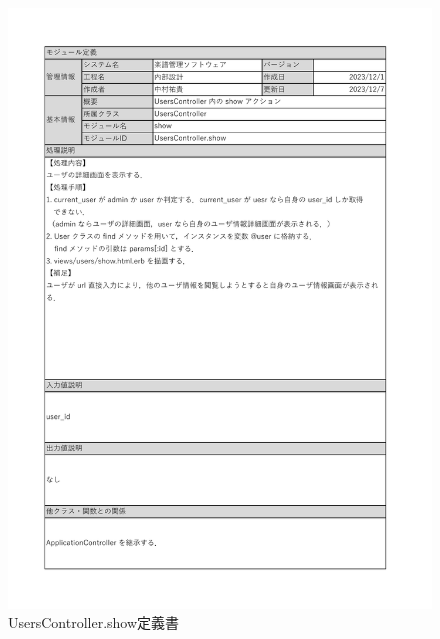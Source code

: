\begin{figure}
    \centering
    \includegraphics[scale=0.7]{img/Users/xlsx/UsersController_show.pdf}
    \vspace{-0.3cm}
    \caption{UsersController.show定義書}
\end{figure}
